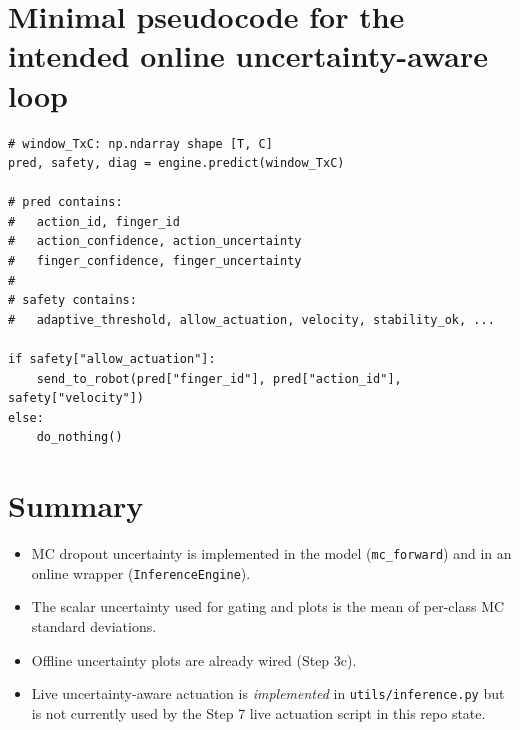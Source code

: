 \documentclass[11pt]{article}
\begin{document}
\section{Minimal pseudocode for the intended online uncertainty-aware loop}

\begin{lstlisting}
# window_TxC: np.ndarray shape [T, C]
pred, safety, diag = engine.predict(window_TxC)

# pred contains:
#   action_id, finger_id
#   action_confidence, action_uncertainty
#   finger_confidence, finger_uncertainty
#
# safety contains:
#   adaptive_threshold, allow_actuation, velocity, stability_ok, ...

if safety["allow_actuation"]:
    send_to_robot(pred["finger_id"], pred["action_id"], safety["velocity"])
else:
    do_nothing()
\end{lstlisting}

\section{Summary}

\begin{itemize}
  \item MC dropout uncertainty is implemented in the model (\texttt{mc\_forward}) and in an online wrapper (\texttt{InferenceEngine}).
  \item The scalar uncertainty used for gating and plots is the mean of per-class MC standard deviations.
  \item Offline uncertainty plots are already wired (Step 3c).
  \item Live uncertainty-aware actuation is \emph{implemented} in \texttt{utils/inference.py} but is not currently used by the Step 7 live actuation script in this repo state.
\end{itemize}
\end{document}
